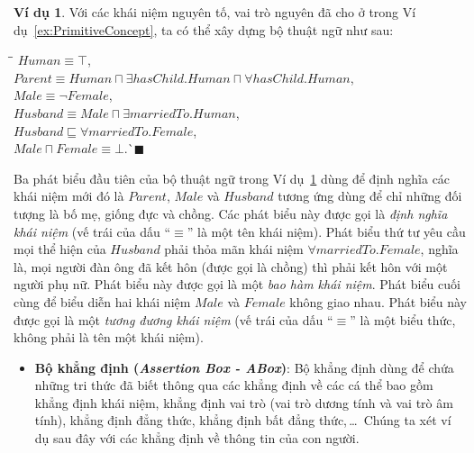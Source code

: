 \documentclass[12pt,a4paper,twoside]{report}
\newcommand{\myend}		{\mbox{}\hfill\mbox{{\scriptsize$\!\blacksquare$}}}
\newcommand{\mand}		{\sqcap}
\newcommand{\V}			{\forall}
\newcommand{\E}			{\exists}
\newcommand{\Human}			{Human}
\newcommand{\Female}		{Female}
\newcommand{\Male}			{Male}
\newcommand{\Parent}		{Parent}
\newcommand{\Husband}		{Husband}
\newcommand{\hasChild}		{hasChild}
\newcommand{\marriedTo}		{marriedTo}
\theoremstyle{definition}
\newtheorem{Example}{Ví dụ}[chapter]
\begin{document}
\begin{Example}\label{ex:TBox}
  Với các khái niệm nguyên tố, vai trò nguyên đã cho ở trong Ví dụ~\ref{ex:PrimitiveConcept}, ta có thể xây dựng bộ thuật ngữ như sau:  
\begin{tabbing}
  \hspace*{.85cm}\=\hspace*{\textwidth}\=\kill
  \> $\Human \equiv \top$,\\[0.5ex]
  \> $\Parent \equiv \Human \mand \E \hasChild.\Human \mand \V \hasChild.\Human$,\\[0.5ex]
  \> $\Male \equiv \neg \Female$,\\[0.5ex]
  \> $\Husband \equiv \Male \mand \E \marriedTo.\Human$,\\[0.5ex]
  \> $\Husband \sqsubseteq \V \marriedTo.\Female$,\\[0.5ex]
  \> $\Male \mand \Female \equiv \bot$.\`\myend
  \end{tabbing}
\end{Example}

Ba phát biểu đầu tiên của bộ thuật ngữ trong Ví dụ~\ref{ex:TBox} dùng để định nghĩa các khái niệm mới đó là $\Parent$, $\Male$ và $\Husband$ tương ứng dùng để chỉ những đối tượng là bố mẹ, giống đực và chồng. Các phát biểu này được gọi là {\em định nghĩa khái niệm} (vế trái của dấu ``$\equiv$'' là một tên khái niệm).
%
Phát biểu thứ tư yêu cầu mọi thể hiện của $\Husband$ phải thỏa mãn khái niệm $\V \marriedTo.\Female$, nghĩa là, mọi người đàn ông đã kết hôn (được gọi là chồng) thì phải kết hôn với một người phụ nữ. Phát biểu này được gọi là một {\em bao hàm khái niệm}.
%
Phát biểu cuối cùng để biểu diễn hai khái niệm $\Male$ và $\Female$ không giao nhau.
Phát biểu này được gọi là một {\em tương đương khái niệm} (vế trái của dấu ``$\equiv$'' là một biểu thức, không phải là tên một khái niệm).
%


\begin{itemize}
  \item \textbf{Bộ khẳng định ({\em Assertion Box - ABox})}: Bộ khẳng định dùng để chứa những tri thức đã biết thông qua các khẳng định về các cá thể bao gồm khẳng định khái niệm, khẳng định vai trò (vai trò dương tính và vai trò âm tính), khẳng định đẳng thức, khẳng định bất đẳng thức,\,\ldots\ Chúng ta xét ví dụ sau đây với các khẳng định về thông tin của con người.
\end{itemize}
\end{document}
